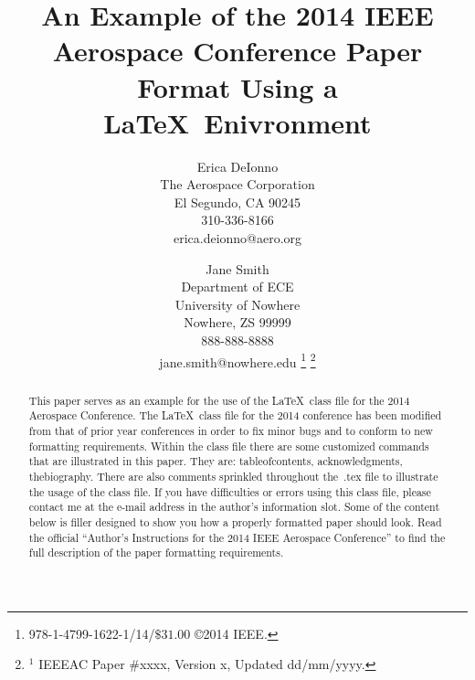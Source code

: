\documentclass[twocolumn,letterpaper]{IEEEAerospaceCLS}  %
\begin{document}
\title{An Example of the 2014 IEEE Aerospace Conference Paper Format Using a \LaTeX~Enivronment}

\author{%
Erica DeIonno\\ 
The Aerospace Corporation\\
El Segundo, CA 90245\\
310-336-8166\\
erica.deionno@aero.org
\and 
Jane Smith\\
Department of ECE\\
University of Nowhere\\
Nowhere, ZS 99999\\
888-888-8888\\
jane.smith@nowhere.edu
\thanks{\footnotesize 978-1-4799-1622-1/14/$\$31.00$ \copyright2014 IEEE.}              %
\thanks{$^1$ IEEEAC Paper \#xxxx, Version x, Updated dd/mm/yyyy.} %
}


\maketitle

\thispagestyle{plain}
\pagestyle{plain}

\begin{abstract}
This paper serves as an example for the use of the \LaTeX~class file for the 2014 Aerospace Conference. The \LaTeX~class file for the 2014 conference has been modified from that of prior year conferences in order to fix minor bugs and to conform to new formatting requirements. Within the class file there are some customized commands that are illustrated in this paper. They are: tableofcontents, acknowledgments, thebiography. There are also comments sprinkled throughout the~.tex file to illustrate the usage of the class file. If you have difficulties or errors using this class file, please contact me at the e-mail address in the author's information slot. Some of the content below is filler designed to show you how a properly formatted paper should look. Read the official ``Author's Instructions for the 2014 IEEE Aerospace Conference'' to find the full description of the paper formatting requirements.
\end{abstract}
\end{document}
